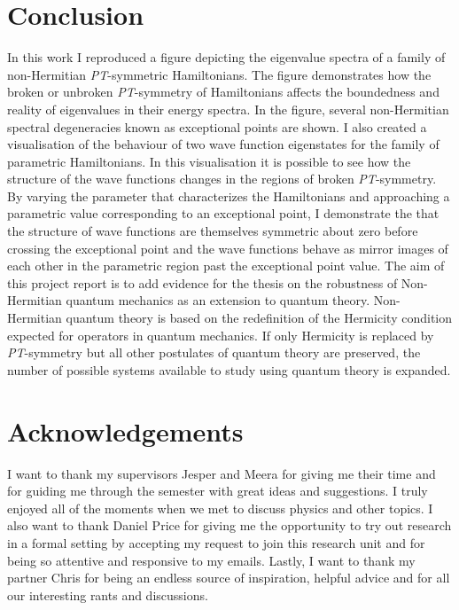 \documentclass[10pt, a4paper, singlespacing]{report}
\newcommand\PT{\emph{PT}}
\begin{document}
\chapter{Conclusion}\label{Conclusion}
 In this work I reproduced a figure depicting the eigenvalue spectra of a family of non-Hermitian \PT-symmetric Hamiltonians. The figure demonstrates how the broken or unbroken \PT-symmetry of Hamiltonians affects the boundedness and reality of eigenvalues in their energy spectra. In the figure, several non-Hermitian spectral degeneracies known as exceptional points are shown. I also created a visualisation of the behaviour of two wave function eigenstates for the family of parametric Hamiltonians. In this visualisation it is possible to see how the structure of the wave functions changes in the regions of broken \PT-symmetry. By varying the parameter that characterizes the Hamiltonians and approaching a parametric value corresponding to an exceptional point, I demonstrate the that the structure of wave functions are themselves symmetric about zero before crossing the exceptional point and the wave functions behave as mirror images of each other in the parametric region past the exceptional point value. The aim of this project report is to add evidence for the thesis on the robustness of Non-Hermitian quantum mechanics as an extension to quantum theory. Non-Hermitian quantum theory is based on the redefinition of the Hermicity condition expected for operators in quantum mechanics. If only Hermicity is replaced by \PT-symmetry but all other postulates of quantum theory are preserved, the number of possible systems available to study using quantum theory is expanded.

\chapter{Acknowledgements}\label{Acknowledgements}
I want to thank my supervisors Jesper and Meera for giving me their time and for guiding me through the semester with great ideas and suggestions. I truly enjoyed all of the moments when we met to discuss physics and other topics. I also want to thank Daniel Price for giving me the opportunity to try out research in a formal setting by accepting my request to join this research unit and for being so attentive and responsive to my emails. Lastly, I want to thank my partner Chris for being an endless source of inspiration, helpful advice and for all our interesting rants and discussions. 
\end{document}
